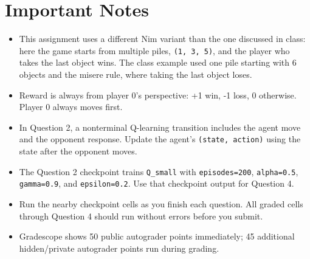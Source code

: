 \documentclass[11pt]{article}
\begin{document}
\section*{Important Notes}
\begin{itemize}
  \item This assignment uses a different Nim variant than the one discussed in class: here the game starts from multiple piles, \texttt{(1, 3, 5)}, and the player who takes the last object wins. The class example used one pile starting with 6 objects and the misere rule, where taking the last object loses.
  \item Reward is always from player 0's perspective: +1 win, -1 loss, 0 otherwise. Player 0 always moves first.
  \item In Question 2, a nonterminal Q-learning transition includes the agent move and the opponent response. Update the agent's \texttt{(state, action)} using the state after the opponent moves.
  \item The Question 2 checkpoint trains \texttt{Q\_small} with \texttt{episodes=200}, \texttt{alpha=0.5}, \texttt{gamma=0.9}, and \texttt{epsilon=0.2}. Use that checkpoint output for Question 4.
  \item Run the nearby checkpoint cells as you finish each question. All graded cells through Question 4 should run without errors before you submit.
  \item Gradescope shows 50 public autograder points immediately; 45 additional hidden/private autograder points run during grading.
\end{itemize}
\end{document}
